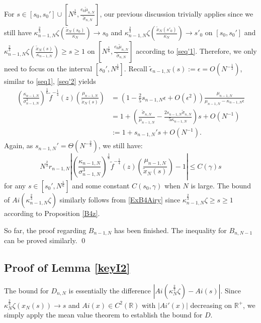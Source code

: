 \documentclass[11pt]{article}
\numberwithin{equation}{section}%
\numberwithin{theorem}{section}
\begin{document}
     For $s\in[s_0,s_0']\cup\left[N^\frac{1}{6},\frac{e_0\tilde\mu_{n,N}}{\tilde\sigma_{n,N}}\right]$, our previous discussion trivially applies since we still have $\kappa_{n-1,N}^\frac{2}{3}\zeta\left(\frac{\tilde{x}_N(s_0)}{\kappa_N}\right)\rightarrow s_0$ and $\kappa_{n-1,N}^\frac{2}{3}\zeta\left(\frac{\tilde{x}_N(s'_0)}{\kappa_N}\right)\rightarrow s'_0$ on   
     $[s_0,s_0']$ and $\kappa_{n-1,N}^\frac{2}{3}\zeta\left(\frac{\tilde{x}_N(s)}{\kappa_{n-1,N}}\right)\ge s\ge1$ on $\left[N^\frac{1}{6},\frac{e_0\tilde\mu_{n,N}}{\tilde\sigma_{n,N}}\right]$ according to \eqref{seq'1}.
     Therefore, we only need to focus on the interval $\left[s_0',N^{\frac{1}{6}}\right]$. Recall $\tilde{\epsilon}_{n-1,N}(s):=\epsilon=O\left(N^{-\frac{1}{2}}\right)$, similar to \eqref{seq1}, \eqref{seq'2} yields
\begin{equation}\label{seq2}
\begin{split}
\left(\frac{\kappa_{n-1,N}}{\sigma_{n-1,N}^3}\right)^{\frac{1}{6}}\tilde{f}^{-\frac{1}{4}}(z)
\left(\frac{\mu_{n-1,N}}{\tilde{x}_N(s)}\right)&=\left(1-\frac{2}{5}s_{n-1,N}\epsilon+O\left(\epsilon^2\right)\right)\frac{\mu_{n-1,N}}{\mu_{n-1,N}-\kappa_{n-1,N}\epsilon}\\
&=1+\left(\frac{\tilde\sigma_{n,N}}{\mu_{n-1,N}}-\frac{2s_{n-1,N}\tilde\sigma_{n,N}}{5\kappa_{n-1,N}}\right)s+O\left(N^{-1}\right)\\&:=1+s_{n-1,N}'s+O\left(N^{-1}\right).
\end{split}
\end{equation}
Again, as $s_{n-1,N}'=\Theta\left(N^{-\frac{2}{3}}\right)$, we still have:
\begin{equation*}
   N^{\frac{2}{3}} r_{n-1,N}\left|\left(\frac{\kappa_{n-1,N}}{\sigma_{n-1,N}^3}\right)^{\frac{1}{6}}\tilde{f}^{-\frac{1}{4}}(z)
\left(\frac{\mu_{n-1,N}}{\tilde{x}_N(s)}\right)-1\right|\le C(\gamma)s
\end{equation*}
for any $s\in\left[s_0',N^{\frac{1}{6}}\right]$ and some constant $C(s_0,\gamma)$ when $N$ is large. The bound of $Ai\left(\kappa_{n-1,N}^\frac{2}{3}\zeta\right)$ similarly follows from \eqref{ExB4Airy} since $\kappa_{n-1,N}^\frac{2}{3}\zeta\ge s\ge 1$ according to Proposition \ref{B4z}.

So far, the proof regarding $B_{n-1,N}$ has been finished. The inequality for $B_{n,N-1}$ can be proved similarly.
\qed   

\subsection{Proof of Lemma \ref{keyI2}}\label{P4I2}
     The bound for $D_{n,N}$ is essentially the difference $\left|Ai\left(\kappa_N^\frac{2}{3}\zeta\right)-Ai(s)\right|$. Since $\kappa_N^\frac{2}{3}\zeta(x_N(s))\rightarrow s$ and $Ai(x)\in C^2(\mathbb{R})$ with $|Ai'(x)|$ decreasing on $\mathbb{R}^+$, we simply apply the mean value theorem to establish the bound for $D$.
\end{document}
